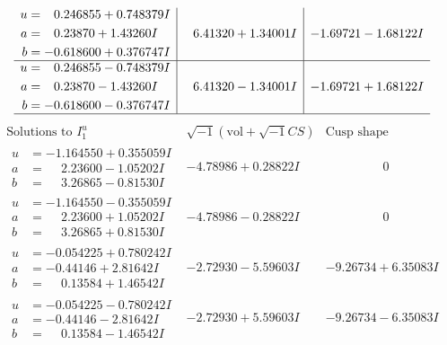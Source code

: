 \documentclass[1p]{elsarticle_modified}
\theoremstyle{definition}
\newcommand{\I}{\sqrt{-1}}
\begin{document}
$$\begin{array}{c|c|c}
\begin{aligned}
u &= \phantom{-}0.246855 + 0.748379 I \\
a &= \phantom{-}0.23870 + 1.43260 I \\
b &= -0.618600 + 0.376747 I\end{aligned}
 & \phantom{-}6.41320 + 1.34001 I & -1.69721 - 1.68122 I \\ \hline\begin{aligned}
u &= \phantom{-}0.246855 - 0.748379 I \\
a &= \phantom{-}0.23870 - 1.43260 I \\
b &= -0.618600 - 0.376747 I\end{aligned}
 & \phantom{-}6.41320 - 1.34001 I & -1.69721 + 1.68122 I\\
 \hline 
 \end{array}$$\newpage$$\begin{array}{c|c|c}  
\text{Solutions to }I^u_{1}& \I (\text{vol} + \sqrt{-1}CS) & \text{Cusp shape}\\
 \hline 
\begin{aligned}
u &= -1.164550 + 0.355059 I \\
a &= \phantom{-}2.23600 - 1.05202 I \\
b &= \phantom{-}3.26865 - 0.81530 I\end{aligned}
 & -4.78986 + 0.28822 I & \phantom{-0.000000 } 0 \\ \hline\begin{aligned}
u &= -1.164550 - 0.355059 I \\
a &= \phantom{-}2.23600 + 1.05202 I \\
b &= \phantom{-}3.26865 + 0.81530 I\end{aligned}
 & -4.78986 - 0.28822 I & \phantom{-0.000000 } 0 \\ \hline\begin{aligned}
u &= -0.054225 + 0.780242 I \\
a &= -0.44146 + 2.81642 I \\
b &= \phantom{-}0.13584 + 1.46542 I\end{aligned}
 & -2.72930 - 5.59603 I & -9.26734 + 6.35083 I \\ \hline\begin{aligned}
u &= -0.054225 - 0.780242 I \\
a &= -0.44146 - 2.81642 I \\
b &= \phantom{-}0.13584 - 1.46542 I\end{aligned}
 & -2.72930 + 5.59603 I & -9.26734 - 6.35083 I \\ \hline\begin{aligned}

\end{aligned}
\end{array}$$
\end{document}

